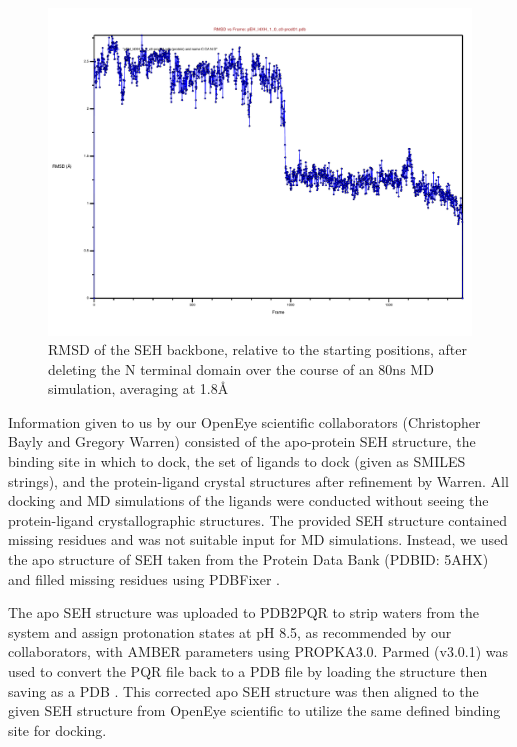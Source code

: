 \begin{figure}
    \centering
    \includegraphics[width=\linewidth]{chapter5/Figures/backbonermsd.pdf}
    \caption[SEH Backbone RMSD]{RMSD of the SEH backbone, relative to the starting positions, after deleting the N terminal domain over the course of an 80ns MD simulation, averaging at 1.8{\AA}}
    \label{fig:backbonermsd}
\end{figure}
Information given to us by our OpenEye scientific collaborators (Christopher Bayly and Gregory Warren) consisted of the apo-protein SEH structure, the binding site in which to dock, the set of ligands to dock (given as SMILES strings), and the protein-ligand crystal structures after refinement by Warren.
All docking and MD simulations of the ligands were conducted without seeing the protein-ligand crystallographic structures.
The provided SEH structure contained missing residues and was not suitable input for MD simulations.
Instead, we used the apo structure of SEH taken from the Protein Data Bank (PDBID: 5AHX) and filled missing residues using PDBFixer \cite{noauthor_pdbfixer_2019}.

The apo SEH structure was uploaded to PDB2PQR \cite{} to strip waters from the system and assign protonation states at pH 8.5, as recommended by our collaborators, with AMBER parameters using PROPKA3.0\cite{jurrus_improvements_2018,sondergaard_improved_2011,noauthor_propka3:_nodate}. 
Parmed (v3.0.1) was used to convert the PQR file back to a PDB file by loading the structure then saving as a PDB \cite{swails_parameter/topology_2019}.
This corrected apo SEH structure was then aligned to the given SEH structure from OpenEye scientific to utilize the same defined binding site for docking.

